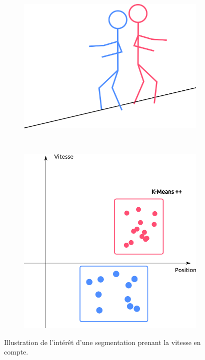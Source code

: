 \begin{figure}[h]
	\begin{center}
		\begin{subfigure}{0.38\textwidth}
			\includegraphics[width=\textwidth]{Chapter5/graphics/k_means_6D_1.png} 
		\end{subfigure}	
		~ ~
		\begin{subfigure}{0.48\textwidth}
			\includegraphics[width=\textwidth]{Chapter5/graphics/k_means_6D_3.png} 
		\end{subfigure}	
		
		\caption{Illustration de l'intérêt d'une segmentation prenant la vitesse en compte.}
		\label{fig:ch5_kmeans_pp_6D}
	\end{center}
\end{figure}

